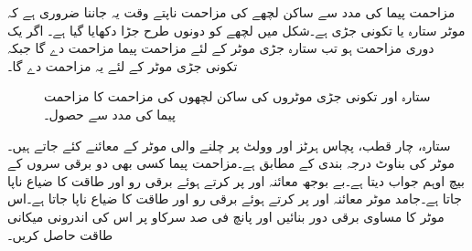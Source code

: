 مزاحمت پیما کی مدد سے ساکن لچھے کی مزاحمت ناپتے وقت یہ جاننا ضروری ہے کہ موٹر ستارہ یا تکونی جڑی ہے۔شکل   میں لچھے کو دونوں طرح جڑا دکھایا گیا ہے۔ اگر یک دوری مزاحمت   ہو تب ستارہ جڑی موٹر کے لئے مزاحمت پیما   مزاحمت دے گا جبکہ تکونی جڑی موٹر کے لئے یہ  مزاحمت دے گا۔
\begin{figure}
\centering
\begin{subfigure}{0.50\textwidth}
\centering
{}
\end{subfigure}\hfill
\begin{subfigure}{0.40\textwidth}
\centering
{}
\end{subfigure}
\caption{ستارہ اور تکونی جڑی موٹروں کی ساکن لچھوں کی مزاحمت کا مزاحمت پیما کی مدد سے حصول۔}
\label{شکل_امالی_ساکن_مزاحمت_کا_حصول}
\end{figure}

ستارہ، چار قطب، پچاس ہرٹز اور  وولٹ پر چلنے والی موٹر کے معائنے کئے جاتے ہیں۔ موٹر کی بناوٹ درجہ بندی   کے مطابق ہے۔مزاحمت پیما کسی بھی دو برقی سروں کے بیچ  اوہم جواب دیتا ہے۔بے بوجھ معائنہ  اور  پر کرتے ہوئے برقی رو  اور طاقت کا ضیاع  ناپا جاتا ہے۔جامد موٹر معائنہ   اور  پر کرتے ہوئے برقی رو  اور طاقت کا ضیاع  ناپا جاتا ہے۔اس موٹر کا مساوی برقی دور بنائیں اور پانچ فی صد سرکاو پر اس کی اندرونی میکانی طاقت حاصل کریں۔

